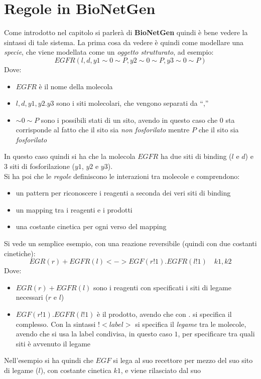 \documentclass[a4paper,12pt, oneside]{book}
\begin{document}
\section{Regole in BioNetGen}
Come introdotto nel capitolo si parlerà di \textbf{BioNetGen} quindi è bene
vedere la sintassi di tale sistema. La prima cosa da vedere è quindi come
modellare una \textit{specie}, che viene modellata come un \textit{oggetto
  strutturato}, ad esempio:
\[EGFR(l,d,y1\sim 0\sim P, y2\sim 0\sim P, y3\sim 0\sim P)\]
Dove:
\begin{itemize}
  \item $EGFR$ è il nome della molecola
  \item $l,d,y1,y2.y3$ sono i siti molecolari, che vengono separati da ``,''
  \item $\sim 0\sim P$ sono i possibili stati di un sito, avendo in questo caso
  che $0$ sta corrisponde al fatto che il sito sia \textit{non fosforilato}
  mentre $P$ che il sito sia \textit{fosforilato}
\end{itemize}
In questo caso quindi si ha che la molecola $EGFR$ ha due siti di binding ($l$ e
$d$) e 3 siti di fosforilazione ($y1$, $y2$ e $y3$).\\
Si ha poi che le \textit{regole} definiscono le interazioni tra molecole e
comprendono:
\begin{itemize}
  \item un pattern per riconoscere i reagenti a seconda dei veri siti di binding
  \item un mapping tra i reagenti e i prodotti
  \item una costante cinetica per ogni verso del mapping
\end{itemize}
Si vede un semplice esempio, con una reazione reversibile (quindi con due
costanti cinetiche):
\[EGR(r)+EGFR(l) <-> EGF(r!1).EGFR(l!1)\quad k1,k2\]
Dove:
\begin{itemize}
  \item $EGR(r)+EGFR(l)$ sono i reagenti con specificati i siti di legame
  necessari ($r$ e $l$)
  \item $EGF(r!1).EGFR(l!1)$ è il prodotto, avendo che con $.$ si specifica il
  complesso. Con la sintassi $!<label>$ si specifica il \textit{legame} tra le
  molecole, avendo 
  che si usa la label condivisa, in questo caso $1$, per specificare tra quali
  siti è 
  avvenuto il legame 
\end{itemize}
Nell'esempio si ha quindi che $EGF$ si lega al suo recettore per mezzo del suo
sito di legame ($l$), con costante cinetica $k1$, e viene rilasciato dal suo
\end{document}
